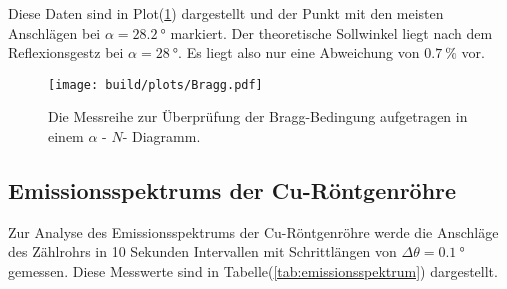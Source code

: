          \noindent Diese Daten sind in Plot(\ref{fig:bragg}) dargestellt und der Punkt mit den meisten Anschlägen bei $\alpha = \SI{28.2}{\degree}$ markiert. 
          Der theoretische Sollwinkel liegt nach dem Reflexionsgestz bei $\alpha = \SI{28}{\degree}$. Es liegt also nur eine Abweichung von 
          $\SI{0.7}{\percent}$ vor.

          \begin{figure}
            \centering
            \texttt{[image: build/plots/Bragg.pdf]}
            \caption{Die Messreihe zur Überprüfung der Bragg-Bedingung aufgetragen in einem $\alpha$ - $N$- Diagramm.}
            \label{fig:bragg}
          \end{figure}

    \subsection{Emissionsspektrums der Cu-Röntgenröhre}\label{sec:Cu-Röntgenröhre}

         
        \noindent Zur Analyse des Emissionsspektrums der Cu-Röntgenröhre werde die Anschläge des Zählrohrs in 10 Sekunden Intervallen mit 
        Schrittlängen von $\Delta \theta = \SI{0.1}{\degree}$ gemessen. Diese Messwerte sind in Tabelle(\ref{tab:emissionsspektrum}) dargestellt.
        
